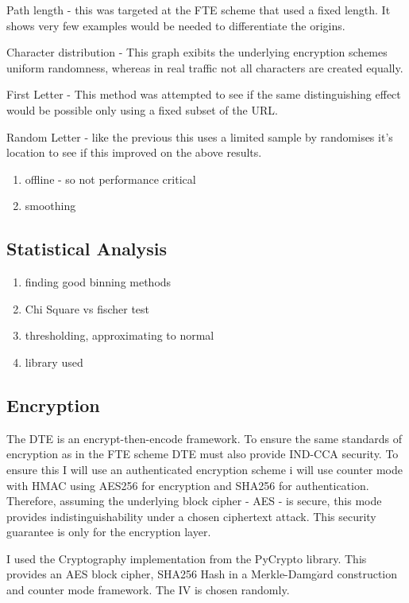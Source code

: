 \documentclass[10pt,a4paper]{article}
\begin{document}
Path length - this was targeted at the FTE scheme that used a fixed length. It shows very few examples would be needed to differentiate the origins.

Character distribution - This graph exibits the underlying encryption schemes uniform randomness, whereas in real traffic not all characters are created equally.

First Letter - This method was attempted to see if the same distinguishing effect would be possible only using a fixed subset of the URL.

Random Letter - like the previous this uses a limited sample by randomises it's location to see if this improved on the above results.


\begin{enumerate}
\item offline - so not performance critical
\item smoothing
\end{enumerate}

\subsection{Statistical Analysis}

\begin{enumerate}
\item finding good binning methods
\item Chi Square vs fischer test
\item thresholding, approximating to normal
\item library used
\end{enumerate}

\subsection{Encryption}

The DTE is an encrypt-then-encode framework. To ensure the same standards of encryption as in the FTE scheme DTE must also provide IND-CCA security. To ensure this I will use an authenticated encryption scheme i will use counter mode with HMAC using AES256 for encryption and SHA256 for authentication. Therefore, assuming the underlying block cipher - AES - is secure, this mode provides indistinguishability under a chosen ciphertext attack. This security guarantee is only for the encryption layer. 


I used the Cryptography implementation from the PyCrypto library. This provides an AES block cipher, SHA256 Hash in a Merkle-Damg$\mathring{a}$rd construction and counter mode framework. The IV is chosen randomly.
\end{document}
